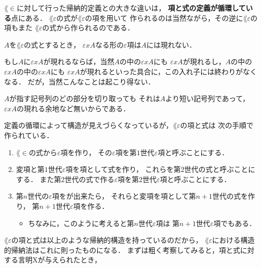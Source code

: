 	$\lang{\in}$に対して行った帰納的定義との大きな違いは，
	{\bf 項と式の定義が循環している}点にある．
	$\lang{\varepsilon}$の式が$\lang{\varepsilon}$の項を用いて
	作られるのは当然ながら，その逆に$\lang{\varepsilon}$の項もまた
	$\lang{\varepsilon}$の式から作られるのである．
	
	\begin{screen}
		\begin{metathm}
			$A$を$\lang{\varepsilon}$の式とするとき，
			$\varepsilon x A$なる形の$\varepsilon$項は$A$には現れない．
		\end{metathm}
	\end{screen}
	
	もし$A$に$\varepsilon x A$が現れるならば，当然$A$の中の$\varepsilon x A$にも
	$\varepsilon x A$が現れるし，$A$の中の$\varepsilon x A$の中の$\varepsilon x A$にも
	$\varepsilon x A$が現れるといった具合に，この入れ子には終わりがなくなる．
	だが，当然こんなことは起こり得ない．
	
	\begin{metaprf}
		$A$が指す記号列のどの部分を切り取っても
		それは$A$より短い記号列であって，$\varepsilon x A$の現れる余地など無いからである．
		\QED
	\end{metaprf}
	
	定義の循環によって構造が見えづらくなっているが，$\lang{\varepsilon}$の項と式は
	次の手順で作られている．
	
	\begin{enumerate}
		\item $\lang{\in}$の式から$\varepsilon$項を作り，
			その$\varepsilon$項を第$1$世代$\varepsilon$項と呼ぶことにする．
		\item 変項と第$1$世代$\varepsilon$項を項として式を作り，
			これらを第$2$世代の式と呼ぶことにする．
			また第$2$世代の式で作る$\varepsilon$項を第$2$世代$\varepsilon$項と呼ぶことにする．
		\item 第$n$世代の$\varepsilon$項をが出来たら，
			それらと変項を項として第$n+1$世代の式を作り，
			第$n+1$世代$\varepsilon$項を作る．
			
			\begin{itemize}
				\item ちなみに，このように考えると第$n$世代$\varepsilon$項は
					第$n+1$世代$\varepsilon$項でもある．
			\end{itemize}
	\end{enumerate}
	
	$\lang{\varepsilon}$の項と式は以上のような帰納的構造を持っているのだから，
	$\lang{\varepsilon}$における構造的帰納法はこれに則ったものになる．
	まずは粗く考察してみると，項と式に対する言明Xが与えられたとき，
	
